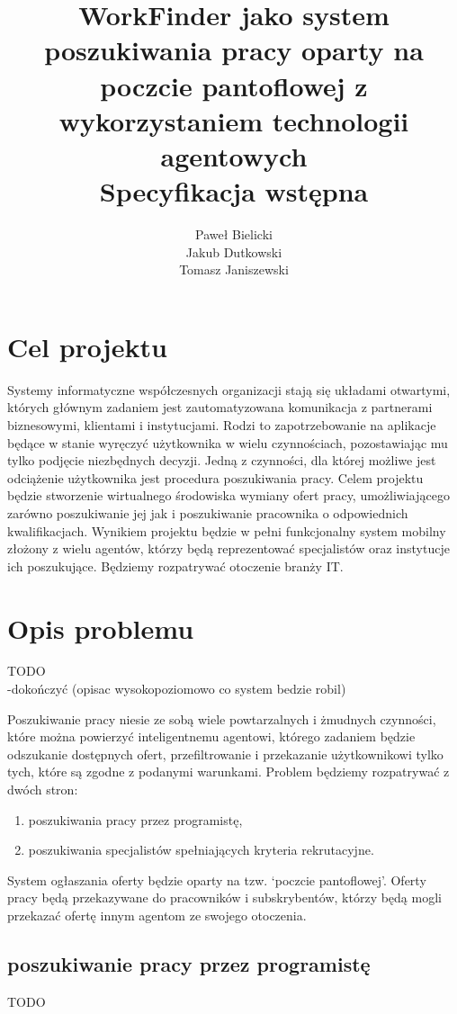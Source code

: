 \documentclass[11pt,a4paper]{article}
\author{
	Paweł Bielicki\\
	Jakub Dutkowski\\
	Tomasz Janiszewski
}
\title{
	\huge{WorkFinder jako system poszukiwania pracy oparty na poczcie pantoflowej z wykorzystaniem technologii agentowych}\\
	\LARGE{Specyfikacja wstępna}
 }
\begin{document}
\maketitle
\newpage

\section{Cel projektu}
Systemy informatyczne współczesnych organizacji stają się układami otwartymi, których głównym zadaniem jest zautomatyzowana komunikacja z partnerami biznesowymi, klientami i instytucjami. Rodzi to zapotrzebowanie na aplikacje będące w stanie wyręczyć użytkownika w wielu czynnościach, pozostawiając mu tylko podjęcie niezbędnych decyzji.
Jedną z czynności, dla której możliwe jest odciążenie użytkownika jest procedura poszukiwania pracy. Celem projektu będzie stworzenie wirtualnego środowiska wymiany ofert pracy, umożliwiającego zarówno poszukiwanie jej jak i poszukiwanie pracownika o odpowiednich kwalifikacjach.
Wynikiem projektu będzie w pełni funkcjonalny system mobilny złożony z wielu agentów, którzy będą reprezentować specjalistów oraz instytucje ich poszukujące. Będziemy rozpatrywać otoczenie branży IT.

\section{Opis problemu}
TODO\\ 
-dokończyć (opisac wysokopoziomowo co system bedzie robil)

Poszukiwanie pracy niesie ze sobą wiele powtarzalnych i żmudnych czynności, które można powierzyć inteligentnemu agentowi, którego zadaniem będzie odszukanie dostępnych ofert, przefiltrowanie i przekazanie użytkownikowi tylko tych, które są zgodne z podanymi warunkami.
Problem będziemy rozpatrywać z dwóch stron:
\begin{enumerate}
	\item poszukiwania pracy przez programistę,
	\item poszukiwania specjalistów spełniających kryteria rekrutacyjne.
\end{enumerate}

System ogłaszania oferty będzie oparty na tzw. `poczcie pantoflowej'. Oferty pracy będą przekazywane do pracowników i subskrybentów, którzy będą mogli przekazać ofertę innym agentom ze swojego otoczenia.


\subsection{poszukiwanie pracy przez programistę}
TODO\\
\end{document}

